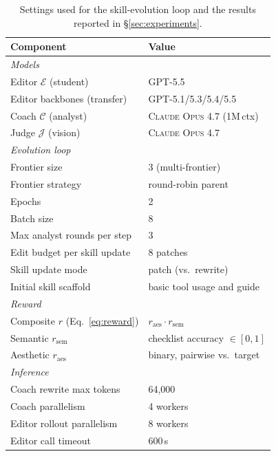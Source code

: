 \documentclass[11pt]{article}
\begin{document}
\begin{table}[!htbp]
\centering\small
\begin{tabular*}{\linewidth}{@{\extracolsep{\fill}}ll@{}}
\toprule
\textbf{Component} & \textbf{Value} \\
\midrule
\multicolumn{2}{l}{\emph{Models}} \\
Editor $\mathcal{E}$ (student)  & \textsc{GPT-5.5} \\
Editor backbones (transfer)     & \textsc{GPT-5.1/5.3/5.4/5.5} \\
Coach $\mathcal{C}$ (analyst)   & \textsc{Claude Opus 4.7} (1M\,ctx) \\
Judge $\mathcal{J}$ (vision)    & \textsc{Claude Opus 4.7} \\
\midrule
\multicolumn{2}{l}{\emph{Evolution loop}} \\
Frontier size                   & 3 (multi-frontier) \\
Frontier strategy               & round-robin parent \\
Epochs                          & 2 \\
Batch size                      & 8 \\
Max analyst rounds per step     & 3 \\
Edit budget per skill update    & 8 patches \\
Skill update mode               & patch (vs.\ rewrite) \\
Initial skill scaffold          & basic tool usage and guide \\
\midrule
\multicolumn{2}{l}{\emph{Reward}} \\
Composite $r$ (Eq.~\ref{eq:reward}) & $r_{\mathrm{aes}} \cdot r_{\mathrm{sem}}$ \\
Semantic $r_{\mathrm{sem}}$         & checklist accuracy $\in [0,1]$ \\
Aesthetic $r_{\mathrm{aes}}$        & binary, pairwise vs.\ target \\
\midrule
\multicolumn{2}{l}{\emph{Inference}} \\
Coach rewrite max tokens        & 64{,}000 \\
Coach parallelism               & 4 workers \\
Editor rollout parallelism      & 8 workers \\
Editor call timeout             & 600\,s \\
\bottomrule
\end{tabular*}
\caption{Settings used for the skill-evolution loop and the
results reported in \S\ref{sec:experiments}.}
\label{tab:settings}
\end{table}
\end{document}
